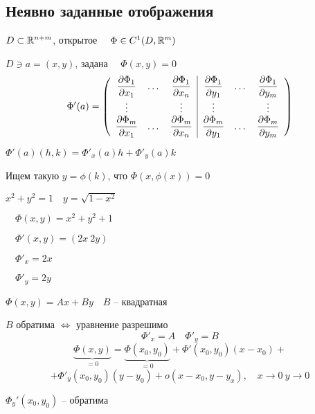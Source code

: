     \subsection*{Неявно заданные отображения}

    $D \subset \mathbb{R}^{n+m}$, открытое $\quad \Phi \in C^1(D, \mathbb{R}^m)$
    \par $D \ni a = (x, y)$, задана $\quad \Phi(x, y) = 0$
    \[
        \Phi'(a) = \left(\begin{array}{c c c | c c c}
            \dfrac{\partial \Phi_1}{\partial x_1} & \dots & \dfrac{\partial \Phi_1}{\partial x_n} & \dfrac{\partial \Phi_1}{\partial y_1} & \dots & \dfrac{\partial \Phi_1}{\partial y_m} \\
            \vdots & & \vdots & \vdots & & \vdots \\
            \dfrac{\partial \Phi_m}{\partial x_1} & \dots & \dfrac{\partial \Phi_m}{\partial x_n} & \dfrac{\partial \Phi_m}{\partial y_1} & \dots & \dfrac{\partial \Phi_m}{\partial y_m} \\
        \end{array}\right)
    \]

    \par $\Phi'(a)(h, k) = \Phi'_x(a)h + \Phi'_y(a)k$
    \par Ищем такую $y = \phi(k)$, что $\Phi(x, \phi(x)) = 0$

    \begin{illustration}
        $x^2 + y^2 = 1 \quad y = \sqrt{1 - x^2}$
        \par $\quad \Phi(x, y) = x^2 + y^2 + 1$
        \par $\quad \Phi'(x, y) = (2x \ 2y)$
        \par $\quad \Phi'_x = 2x$
        \par $\quad \Phi'_y = 2y$
    \end{illustration}

    \begin{illustration}
        $\Phi(x, y) = Ax + By \quad B$ -- квадратная
        \par \quad $B$ обратима $\Leftrightarrow$ уравнение разрешимо
        \[
            \Phi'_x = A \quad \Phi'_y = B    
        \]
        \[
            \underbrace{\Phi(x, y)}_{=0} = \underbrace{\Phi(x_0, y_0)}_{=0} + \Phi'(x_0, y_0)(x - x_0) +    
        \]
        \[
            + \Phi'_y(x_0, y_0)(y - y_0) + o(x-x_0, y-y_x), \quad x \rightarrow 0 \ y \rightarrow 0    
        \]
        \par $\Phi_y'(x_0, y_0)$ -- обратима
    \end{illustration}

